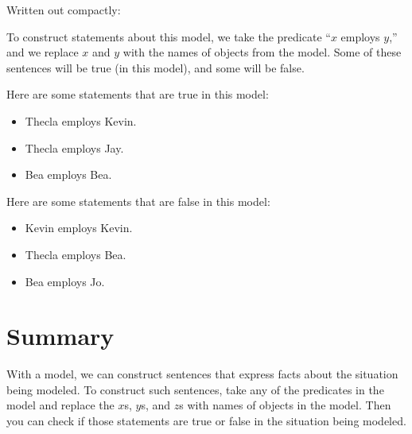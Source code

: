\documentclass[../../../main.tex]{subfiles}
\begin{document}
\noindent
Written out compactly:

\begin{model}
\end{model}

\noindent
To construct statements about this model, we take the predicate ``$x$ employs $y$,'' and we replace $x$ and $y$ with the names of objects from the model. Some of these sentences will be true (in this model), and some will be false.

Here are some statements that are true in this model:

\begin{itemize}
  \item{Thecla employs Kevin.}
  \item{Thecla employs Jay.}
  \item{Bea employs Bea.}
\end{itemize}

\noindent
Here are some statements that are false in this model:

\begin{itemize}
  \item{Kevin employs Kevin.}
  \item{Thecla employs Bea.}
  \item{Bea employs Jo.}
\end{itemize}


\section{Summary}

With a model, we can construct sentences that express facts about the situation being modeled. To construct such sentences, take any of the predicates in the model and replace the $x$s, $y$s, and $z$s with names of objects in the model. Then you can check if those statements are true or false in the situation being modeled.
\end{document}
